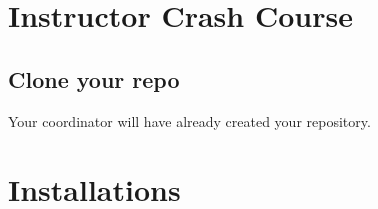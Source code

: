 \documentclass[
]{book}
\begin{document}
\chapter{Instructor Crash Course}\label{instructor-crash-course}

\section{Clone your repo}\label{clone-your-repo}

Your coordinator will have already created your repository.

\chapter{Installations}\label{installations}

  
\end{document}
